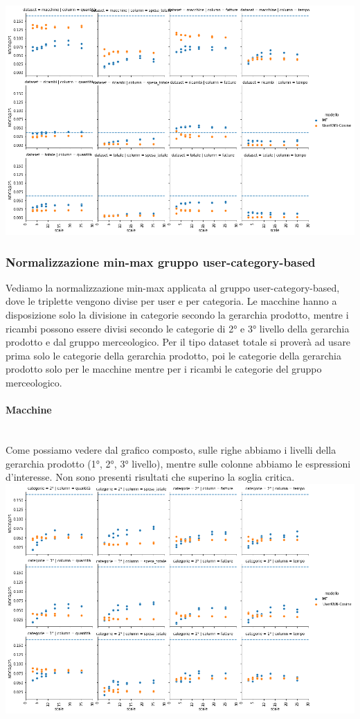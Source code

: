 \includegraphics[width=16cm]{figures/risultati_minmax_singolo.png}
\newpage
\subsubsection{Normalizzazione min-max gruppo user-category-based}
Vediamo la normalizzazione min-max applicata al gruppo user-category-based, dove le triplette vengono divise per user e per categoria.
Le macchine hanno a disposizione solo la divisione in categorie secondo la gerarchia prodotto, mentre i ricambi possono essere divisi secondo le categorie di 2° e 3° livello della gerarchia prodotto e dal gruppo merceologico. Per il tipo dataset totale si proverà ad usare prima solo le categorie della gerarchia prodotto, poi le categorie della gerarchia prodotto solo per le macchine mentre per i ricambi le categorie del gruppo merceologico.

\paragraph{Macchine}\mbox{} \\
Come possiamo vedere dal grafico composto, sulle righe abbiamo i livelli della gerarchia prodotto (1°, 2°, 3° livello), mentre sulle colonne abbiamo le espressioni d'interesse. 
Non sono presenti risultati che superino la soglia critica.\\

\includegraphics[width=16cm]{figures/risultati_minmax_categoria_macchine.png}
\newpage

